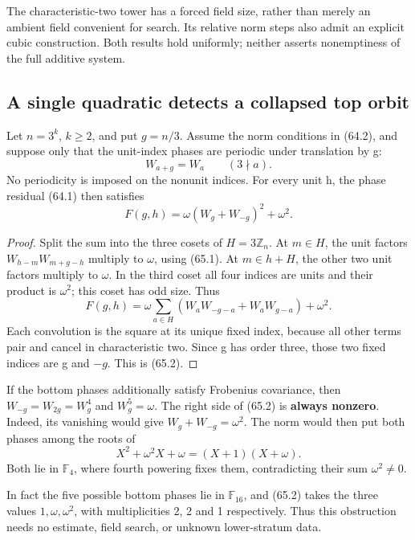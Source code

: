 \documentclass[11pt,reqno]{amsart}
\theoremstyle{plain}
\begin{document}
The characteristic-two tower has a forced field size, rather than merely
an ambient field convenient for search. Its relative norm steps also
admit an explicit cubic construction. Both results hold uniformly;
neither asserts nonemptiness of the full additive system.

\subsection{A single quadratic detects a collapsed top orbit}\label{sec:65.1}

Let \(n=3^k\), \(k\ge2\), and put \(g=n/3\). Assume the
norm conditions in (64.2), and suppose only that the unit-index phases
are periodic under translation by g:
\begin{equation*}
 W_{a+g}=W_a\qquad(3\nmid a).
 \tag{65.1}
\end{equation*}
No periodicity is imposed on the nonunit indices. For every unit h,
the phase residual (64.1) then satisfies
\begin{equation*}
 \boxed{F(g,h)=\omega(W_g+W_{-g})^2+\omega^2.}
 \tag{65.2}
\end{equation*}

\begin{proof}
Split the sum into the three cosets of
\(H=3\mathbb Z_n\). At \(m\in H\), the unit factors
\(W_{h-m}W_{m+g-h}\) multiply to \(\omega\), using (65.1).
At \(m\in h+H\), the other two unit factors multiply to
\(\omega\). In the third coset all four indices are units and
their product is \(\omega^2\); this coset has odd size. Thus
\[
 F(g,h)=\omega\sum_{a\in H}
       (W_aW_{-g-a}+W_aW_{g-a})+\omega^2.
\]
Each convolution is the square at its unique fixed index, because
all other terms pair and cancel in characteristic two. Since g has
order three, those two fixed indices are g and \(-g\). This is
(65.2).
\end{proof}

If the bottom phases additionally satisfy Frobenius covariance, then
\(W_{-g}=W_{2g}=W_g^4\) and \(W_g^5=\omega\). The right side
of (65.2) is \textbf{always nonzero}. Indeed, its vanishing would give
\(W_g+W_{-g}=\omega^2\). The norm would then put both phases
among the roots of
\[
 X^2+\omega^2X+\omega=(X+1)(X+\omega).
\]
Both lie in \(\mathbb F_4\), where fourth powering fixes them,
contradicting their sum \(\omega^2\ne0\).

In fact the five possible bottom phases lie in \(\mathbb F_{16}\),
and (65.2) takes the three values \(1,\omega,\omega^2\), with
multiplicities 2, 2 and 1 respectively. Thus this obstruction needs
no estimate, field search, or unknown lower-stratum data.
\end{document}
